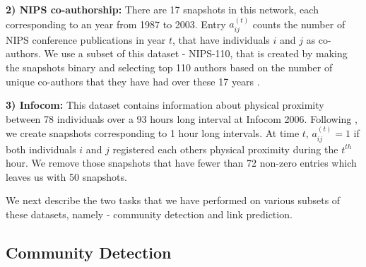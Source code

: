 \documentclass[letterpaper]{article} %
\begin{document}
\textbf{2) NIPS co-authorship:}
There are 17 snapshots in this network, each corresponding to an year from 1987 to 2003. Entry ${a_{ij}^{(t)}}$ counts the number of NIPS conference publications in year ${t}$, that have individuals ${i}$ and ${j}$ as co-authors. We use a subset of this dataset - NIPS-110, that is created by making the snapshots binary and selecting top 110 authors based on the number of unique co-authors that they have had over these 17 years \cite{HeaukulaniEtAl:2013:DynamicProbabilisticModelsForLatentFeaturePropagationInSocialNetworks}.

\textbf{3) Infocom:} This dataset contains information about physical proximity between 78 individuals over a 93 hours long interval at Infocom 2006. Following \cite{KimEtAl:2013:NonparametricMultiGroupMembershipModelForDynamicNetworks}, we create snapshots corresponding to 1 hour long intervals. At time ${t}$, ${a_{ij}^{(t)}} = 1$ if both individuals ${i}$ and ${j}$ registered each others physical proximity during the ${t}^{th}$ hour. We remove those snapshots that have fewer than 72 non-zero entries which leaves us with 50 snapshots.

We next describe the two tasks that we have performed on various subsets of these datasets, namely - community detection and link prediction.


\subsection{Community Detection}
\label{section:communitydetection}
\end{document}
